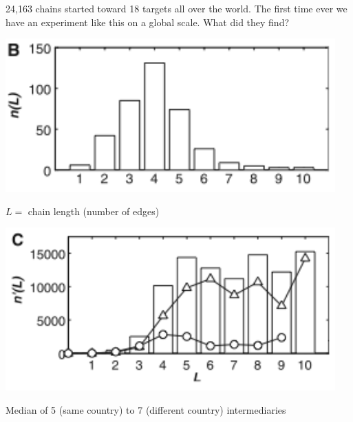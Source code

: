 \documentclass[aspectratio=169]{beamer}
\begin{document}
\begin{frame}

24,163 chains started toward 18 targets all over the world.  The first time ever we have an experiment like this on a global scale.  What did they find?  


\end{frame}
\begin{frame}

\begin{center}
\includegraphics[width = 0.95\textwidth]{figures/dodds_experimental_2003_fig2b}
\end{center}

\vfill
$L =$ chain length (number of edges)


\end{frame}
\begin{frame}

\begin{center}
\includegraphics[width = 0.95\textwidth]{figures/dodds_experimental_2003_fig2c}
\end{center}

\vfill
Median of 5 (same country) to 7 (different country) intermediaries


\end{frame}
\end{document}
